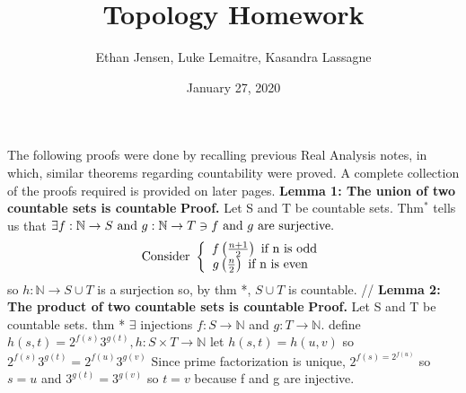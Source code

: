 \documentclass[12pt]{article}
\title{Topology Homework}
\author{Ethan Jensen, Luke Lemaitre, Kasandra Lassagne}
\date{January 27, 2020}
\begin{document}
	\maketitle
	The following proofs were done by recalling previous Real Analysis notes, in which, similar theorems regarding countability were proved. \newline \newline
	A complete collection of the proofs required is provided on later pages.
	\newline
	\newline
	\textbf{Lemma 1: The union of two countable sets is countable}
	\newline \newline
	\textbf{Proof. } \newline
	Let S and T be countable sets.
	Thm\(^*\) tells us that  \(\exists f:\mathbb{N}\rightarrow S \textup{ and } g:\mathbb{N}\rightarrow T \ni f \textup{ and } g \textup{ are surjective.}\) \newline
	\[\textup{Consider } \left\{ \begin{array}{ccc} f\left(\frac{n+1}{2}\right) \textup{ if n is odd}\\ g\left(\frac{n}{2}\right) \textup{ if n is even }\
	\end{array}\right.\]
	so \(h:\mathbb{N}\rightarrow S \cup T\) is a surjection
	\newline
	so, by thm *, \(S \cup T\) is countable. //
	\newline \newline
	\textbf{Lemma 2: The product of two countable sets is countable}
	\newline \newline
	\textbf{Proof. } \newline
	Let S and T be countable sets. \newline
	thm * \(\exists\) injections \(f:S \rightarrow \mathbb{N}\) and \(g: T \rightarrow \mathbb{N}\). \newline
	define \(h(s,t)=2^{f(s)}3^{g(t)}, h: S \times T \rightarrow \mathbb{N}\) \newline
	let \(h(s,t)=h(u,v)\) \newline
	so \(2^{f(s)}3^{g(t)}=2^{f(u)}3^{g(v)}\) \newline
	Since prime factorization is unique, \newline
	\(2^{f(s)=2^{f(u)}}\) so \(s=u\) \newline
	and \(3^{g(t)}=3^{g(v)}\) so \(t=v\) \newline
	because f and g are injective. \newline
\end{document}
